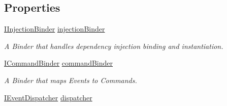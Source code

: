 \subsection*{Properties}
\begin{DoxyCompactItemize}
\item 
\hypertarget{classstrange_1_1extensions_1_1context_1_1impl_1_1_m_v_c_s_context_afe136a86f154ed170eb60fb655b18548}{\hyperlink{interfacestrange_1_1extensions_1_1injector_1_1api_1_1_i_injection_binder}{I\-Injection\-Binder} \hyperlink{classstrange_1_1extensions_1_1context_1_1impl_1_1_m_v_c_s_context_afe136a86f154ed170eb60fb655b18548}{injection\-Binder}}\label{classstrange_1_1extensions_1_1context_1_1impl_1_1_m_v_c_s_context_afe136a86f154ed170eb60fb655b18548}

\begin{DoxyCompactList}\small\item\em A Binder that handles dependency injection binding and instantiation. \end{DoxyCompactList}\item 
\hypertarget{classstrange_1_1extensions_1_1context_1_1impl_1_1_m_v_c_s_context_a7100de9c1148ef6c3300b8e608d0ed00}{\hyperlink{interfacestrange_1_1extensions_1_1command_1_1api_1_1_i_command_binder}{I\-Command\-Binder} \hyperlink{classstrange_1_1extensions_1_1context_1_1impl_1_1_m_v_c_s_context_a7100de9c1148ef6c3300b8e608d0ed00}{command\-Binder}}\label{classstrange_1_1extensions_1_1context_1_1impl_1_1_m_v_c_s_context_a7100de9c1148ef6c3300b8e608d0ed00}

\begin{DoxyCompactList}\small\item\em A Binder that maps Events to Commands. \end{DoxyCompactList}\item 
\hypertarget{classstrange_1_1extensions_1_1context_1_1impl_1_1_m_v_c_s_context_a007607f0cf13edd1ddeb0a7c47808bd3}{\hyperlink{interfacestrange_1_1extensions_1_1dispatcher_1_1eventdispatcher_1_1api_1_1_i_event_dispatcher}{I\-Event\-Dispatcher} \hyperlink{classstrange_1_1extensions_1_1context_1_1impl_1_1_m_v_c_s_context_a007607f0cf13edd1ddeb0a7c47808bd3}{dispatcher}}\label{classstrange_1_1extensions_1_1context_1_1impl_1_1_m_v_c_s_context_a007607f0cf13edd1ddeb0a7c47808bd3}


\end{DoxyCompactItemize}
